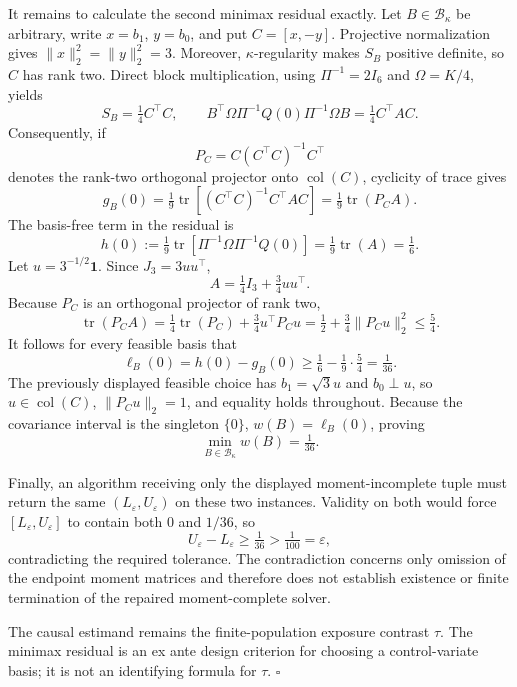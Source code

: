 It remains to calculate the second minimax residual exactly.  Let \(B\in\mathcal B_\kappa\) be arbitrary, write \(x=b_1\), \(y=b_0\), and put \(C=[x,-y]\).  Projective normalization gives \(\lVert x\rVert_2^2=\lVert y\rVert_2^2=3\).  Moreover, \(\kappa\)-regularity makes \(S_B\) positive definite, so \(C\) has rank two.  Direct block multiplication, using \(\Pi^{-1}=2I_6\) and \(\Omega=K/4\), yields
\[
S_B=\tfrac14C^{\top}C,
\qquad
B^{\top}\Omega\Pi^{-1}Q(0)\Pi^{-1}\Omega B
=\tfrac14C^{\top}AC.
\]
Consequently, if
\[
P_C=C(C^{\top}C)^{-1}C^{\top}
\]
denotes the rank-two orthogonal projector onto \(\operatorname{col}(C)\), cyclicity of trace gives
\[
g_B(0)
=\tfrac19\operatorname{tr}\!\left[(C^{\top}C)^{-1}C^{\top}AC\right]
=\tfrac19\operatorname{tr}(P_CA).
\]
The basis-free term in the residual is
\[
h(0)
:=\tfrac19\operatorname{tr}\!\left[\Pi^{-1}\Omega\Pi^{-1}Q(0)\right]
=\tfrac19\operatorname{tr}(A)
=\tfrac16.
\]
Let \(u=3^{-1/2}\mathbf 1\).  Since \(J_3=3uu^{\top}\),
\[
A=\tfrac14I_3+\tfrac34uu^{\top}.
\]
Because \(P_C\) is an orthogonal projector of rank two,
\[
\operatorname{tr}(P_CA)
=\tfrac14\operatorname{tr}(P_C)+\tfrac34u^{\top}P_Cu
=\tfrac12+\tfrac34\lVert P_Cu\rVert_2^2
\le\tfrac54.
\]
It follows for every feasible basis that
\[
\ell_B(0)=h(0)-g_B(0)
\ge\tfrac16-\tfrac19\cdot\tfrac54
=\tfrac1{36}.
\]
The previously displayed feasible choice has \(b_1=\sqrt3u\) and \(b_0\perp u\), so \(u\in\operatorname{col}(C)\), \(\lVert P_Cu\rVert_2=1\), and equality holds throughout.  Because the covariance interval is the singleton \(\{0\}\), \(w(B)=\ell_B(0)\), proving
\[
\min_{B\in\mathcal B_\kappa}w(B)=\tfrac1{36}.
\]

Finally, an algorithm receiving only the displayed moment-incomplete tuple must return the same \((L_{\varepsilon},U_{\varepsilon})\) on these two instances.  Validity on both would force \([L_{\varepsilon},U_{\varepsilon}]\) to contain both \(0\) and \(1/36\), so
\[
U_{\varepsilon}-L_{\varepsilon}\ge\tfrac1{36}>\tfrac1{100}=\varepsilon,
\]
contradicting the required tolerance.  The contradiction concerns only omission of the endpoint moment matrices and therefore does not establish existence or finite termination of the repaired moment-complete solver.

The causal estimand remains the finite-population exposure contrast \(\tau\).  The minimax residual is an ex ante design criterion for choosing a control-variate basis; it is not an identifying formula for \(\tau\).  \(\square\)